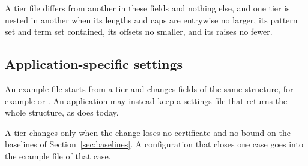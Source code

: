 A tier file differs from another in these fields and nothing else, and one tier is nested in another when its lengths and caps are entrywise no larger, its pattern set and term set contained, its offsets no smaller, and its raises no fewer.

\subsection{Application-specific settings}\label{sec:app-settings}

An example file starts from a tier and changes fields of the same structure, for example  or . An application may instead keep a settings file  that returns the whole structure, as  does today.

A tier changes only when the change loses no certificate and no bound on the baselines of Section~\ref{sec:baselines}. A configuration that closes one case goes into the example file of that case.

